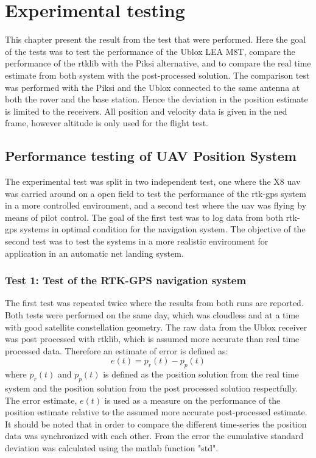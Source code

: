 
\chapter{Experimental testing}
This chapter present the result from the test that were performed. Here the goal of the tests was to test the performance of the Ublox LEA M8T, compare the performance of the \acrfull{rtklib} with the Piksi alternative, and to compare the real time estimate from both system with the post-processed solution. The comparison test was performed with the Piksi and the Ublox connected to the same antenna at both the rover and the base station. Hence the deviation in the position estimate is limited to the receivers. All position and velocity data is given in the \gls{ned} frame, however altitude is only used for the flight test.
\section{Performance testing of UAV Position System}
The experimental test was split in two independent test, one where the X8 \gls{uav} was carried around on a open field to test the performance of the \gls{rtk-gps} system in a more controlled environment, and a second test where the \gls{uav} was flying by means of pilot control. The goal of the first test was to log data from both \gls{rtk-gps} systems in optimal condition for the navigation system. The objective of the second test was to test the systems in a more realistic environment for application in an automatic net landing system. 


\subsection{Test 1: Test of the RTK-GPS navigation system}
The first test was repeated twice where the results from both runs are reported. Both tests were performed on the same day, which was cloudless and at a time with good satellite constellation geometry. The raw data from the Ublox receiver was post processed with \gls{rtklib}, which is assumed more accurate than real time processed data. Therefore an estimate of error is defined as:
\begin{equation}
e(t) = p_r(t) - p_p(t)
\end{equation}
where $p_r(t)$ and $p_p(t)$ is defined as the position solution from the real time system and the position solution from the post processed solution respectfully. The error estimate, $e(t)$ is used as a measure on the performance of the position estimate relative to the assumed more accurate post-processed estimate. It should be noted that in order to compare the different time-series the position data was synchronized with each other. From the error the cumulative standard deviation was calculated using the matlab function "std".
